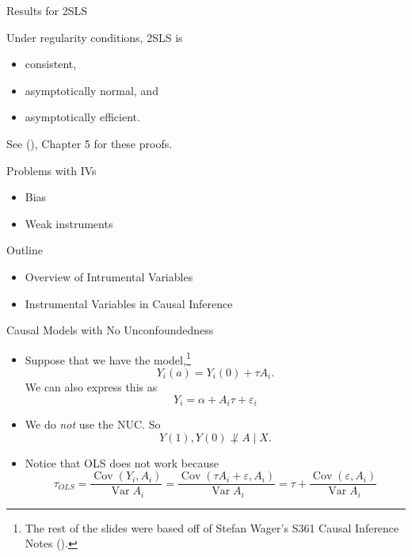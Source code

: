 \documentclass[handout]{beamer} %
\DeclareMathOperator*{\Cov}{Cov}
\DeclareMathOperator*{\Var}{Var}
\begin{document}
\begin{frame}{Results for 2SLS}

Under regularity conditions, 2SLS is
\begin{itemize}
  \item consistent,
  \item asymptotically normal, and 
  \item asymptotically efficient.
\end{itemize}

  See (\cite{wooldridge2010econometric}), Chapter 5 for these proofs.

\end{frame}

\begin{frame}{Problems with IVs}

  \begin{itemize}
    \item<2-> Bias
    \item<3-> Weak instruments
  \end{itemize}
  
\end{frame}

\begin{frame}{Outline}

{

\begin{itemize}
    \item<0> Overview of Intrumental Variables
    \item<1> Instrumental Variables in Causal Inference
\end{itemize}
}

\end{frame}

\begin{frame}{Causal Models with No Unconfoundedness}

  \begin{itemize}
    \item Suppose that we have the model,\footnote{The rest of the slides were
      based off of Stefan Wager's S361 Causal Inference Notes
      (\cite{wager2020stats}).}
      \[Y_i(a) = Y_i(0) + \tau A_i.\]
      We can also express this as 
      \[Y_i = \alpha + A_i \tau + \varepsilon_i\]
    \item We do \textit{not} use the NUC. So 
      \[Y(1), Y(0) \not\perp A \mid X.\]
    \item Notice that OLS does not work because
      \[\tau_{OLS} = \frac{\Cov(Y_i, A_i)}{\Var{A_i}} = 
      \frac{\Cov(\tau A_i + \varepsilon, A_i)}{\Var{A_i}} =
      \tau + 
      \frac{\Cov(\varepsilon, A_i)}{\Var{A_i}}\]
  \end{itemize}
  
\end{frame}
\end{document}

